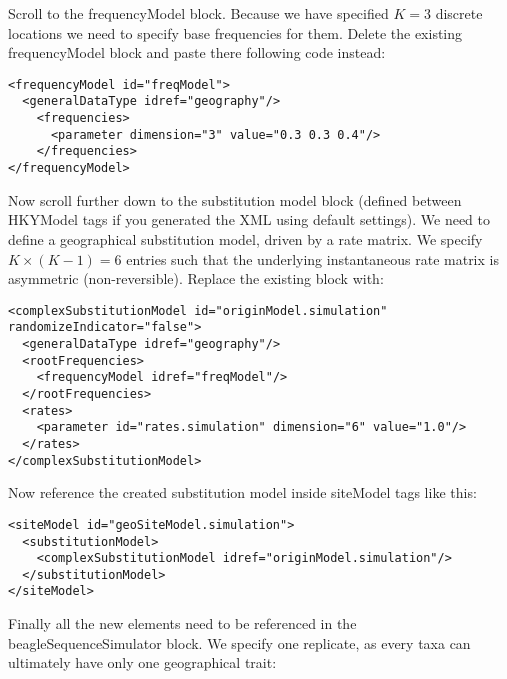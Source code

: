 \medskip{}

Scroll to the {\color{darkblue}\mbox{frequencyModel}} block. Because we have specified $K=3$ discrete locations we need to specify base frequencies for them. Delete the existing {\color{darkblue}\mbox{frequencyModel}} block and paste there following code instead:

\medskip{}

\begin{lstlisting}
<frequencyModel id="freqModel">
  <generalDataType idref="geography"/>
    <frequencies>
      <parameter dimension="3" value="0.3 0.3 0.4"/>
    </frequencies>
</frequencyModel>
\end{lstlisting}

\medskip{}

Now scroll further down to the substitution model block (defined between {\color{darkblue}\mbox{HKYModel}} tags if you generated the XML using default settings). 
We need to define a geographical substitution model, driven by a rate matrix. 
We specify $K\times(K-1)=6$ entries such that the underlying instantaneous rate matrix is asymmetric (non-reversible). 
Replace the existing block with: 

\medskip{}

\begin{lstlisting}
<complexSubstitutionModel id="originModel.simulation" randomizeIndicator="false">
  <generalDataType idref="geography"/>
  <rootFrequencies>
    <frequencyModel idref="freqModel"/>
  </rootFrequencies>
  <rates>
    <parameter id="rates.simulation" dimension="6" value="1.0"/>
  </rates>
</complexSubstitutionModel>
\end{lstlisting}

\medskip{}

Now reference the created substitution model inside {\color{darkblue}\mbox{siteModel}} tags like this:

\medskip{}

\begin{lstlisting}
<siteModel id="geoSiteModel.simulation">
  <substitutionModel>
    <complexSubstitutionModel idref="originModel.simulation"/>
  </substitutionModel>
</siteModel>
\end{lstlisting}

\medskip{}

Finally all the new elements need to be referenced in the \newline
{\color{darkblue}\mbox{beagleSequenceSimulator}} block. 
We specify one replicate, as every taxa can ultimately have only one geographical trait:

